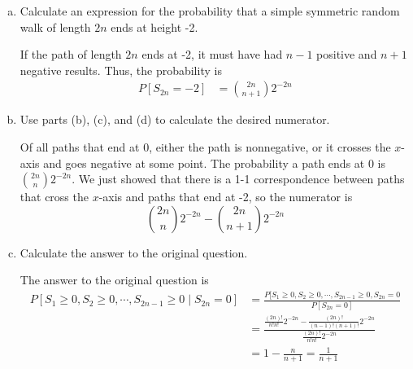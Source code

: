 \documentclass{article}
\begin{document}
\begin{enumerate}[(1)]
\begin{enumerate}[(a)]
			\item Calculate an expression for the probability that a simple symmetric random walk of length $2n$ ends at height -2.
				\begin{soln}
					If the path of length $2n$ ends at -2, it must have had $n-1$ positive and $n+1$ negative results. Thus, the probability is
					\begin{align*}
						P[S_{2n}=-2] &= \binom{2n}{n+1}2^{-2n}
					\end{align*}
				\end{soln}

				\newpage
			\item Use parts (b), (c), and (d) to calculate the desired numerator.
				\begin{soln}
					Of all paths that end at 0, either the path is nonnegative, or it crosses the $x$-axis and goes negative at some point. The probability a path ends at 0 is $\binom{2n}{n}2^{-2n}.$ We just showed that there is a 1-1 correspondence between paths that cross the $x$-axis and paths that end at -2, so the numerator is
					\[\binom{2n}{n}2^{-2n}-\binom{2n}{n+1}2^{-2n}\]
				\end{soln}

			\item Calculate the answer to the original question.
				\begin{soln}
					The answer to the original question is
					\begin{align*}
						P[S_1\ge0, S_2\ge0, \cdots, S_{2n-1}\ge0\mid S_{2n}=0] &= \frac{P[S_1\ge0, S_2\ge0, \cdots, S_{2n-1}\ge0, S_{2n}=0}{P[S_{2n}=0]} \\
						&= \frac{\frac{(2n)!}{n!n!}2^{-2n}-\frac{(2n)!}{(n-1)!(n+1)!}2^{-2n}}{\frac{(2n)!}{n!n!}2^{-2n}} \\
						&= 1- \frac{n}{n+1} = \boxed{\frac{1}{n+1}}
					\end{align*}
				\end{soln}
				
		\end{enumerate}
		
\end{enumerate}
\end{document}
